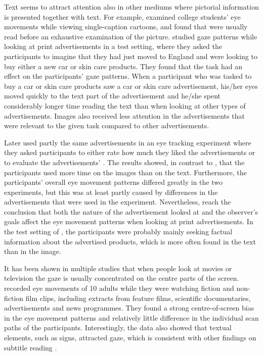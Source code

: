 \documentclass[output=paper]{langsci/langscibook}
\begin{document}
Text seems to attract attention also in other mediums where pictorial information is presented together with text. For example, \citet{carroll1992} examined college students' eye movements while viewing single-caption cartoons, and found that  were usually read before an exhaustive examination of the picture. \citet{rayner2001} studied gaze patterns while looking at print advertisements in a test setting, where they asked the participants to imagine that they had just moved to England and were looking to buy either a new car or skin care products. They found that the task had an effect on the participants' gaze patterns. When a participant who was tasked to buy a car or skin care products saw a car or skin care advertisement, his/her eyes moved quickly to the text part of the advertisement and he/she spent considerably longer time reading the text than when looking at other types of advertisements. Images also received less attention in the advertisements that were relevant to the given task compared to other advertisements.

Later \citet{rayner2008} used partly the same advertisements in an eye tracking experiment where they asked participants to either rate how much they liked the advertisements or to evaluate the advertisements' . The results showed, in contrast to \citet{rayner2001}, that the participants used more time on the images than on the text. Furthermore, the participants' overall eye movement patterns differed greatly in the two experiments, but this was at least partly caused by differences in the advertisements that were used in the experiment. Nevertheless, \citet{rayner2008} reach the conclusion that both the nature of the advertisement looked at and the observer's goals affect the eye movement patterns when looking at print advertisements. In the test setting of \citet{rayner2008}, the participants were probably mainly seeking factual information about the advertised products, which is more often found in the text than in the image. 
 
 
It has been shown in multiple studies that when people look at movies or television the gaze is usually concentrated on the centre parts of the screen. \citet{tosi1997} recorded eye movements of 10 adults while they were watching fiction and non-fiction film clips, including extracts from feature films, scientific documentaries, advertisements and news programmes. They found a strong centre-of-screen bias in the eye movement patterns and relatively little difference in the individual scan paths of the participants. Interestingly, the data also showed that textual elements, such as signs, attracted gaze, which is consistent with other findings on subtitle reading \citep{dydewalle1987, dydewalle1991, dydewalle1992}. 
\end{document}
